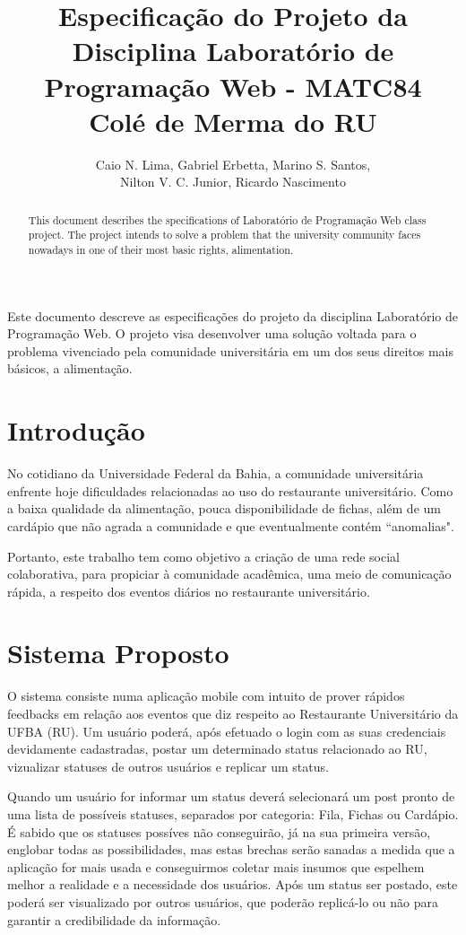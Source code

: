 \documentclass[12pt]{article}
\title{Especificação do Projeto da Disciplina Laboratório de Programação Web - MATC84\\ Colé de Merma do RU}
\author{Caio N. Lima\inst{1}, Gabriel Erbetta\inst{1}, Marino S. Santos\inst{1}, \\
  Nilton V. C. Junior\inst{1},  Ricardo Nascimento\inst{1}}
\begin{document}
\maketitle

\begin{abstract}
  This document describes the specifications of Laboratório de Programação Web class project.
  The project intends to solve a problem that the university community faces nowadays 
  in one of their most basic rights, alimentation.
\end{abstract}

\begin{resumo}
  Este documento descreve as especificações do projeto da disciplina Laboratório
  de Programação Web. O projeto visa desenvolver uma solução voltada para o problema
  vivenciado pela comunidade universitária em um dos seus direitos mais básicos, a alimentação.
\end{resumo}


\section{Introdução}

No cotidiano da Universidade Federal da Bahia, a comunidade universitária
enfrente hoje dificuldades relacionadas ao
uso do restaurante universitário. Como a baixa qualidade da alimentação,
pouca disponibilidade de fichas, além de um cardápio que não agrada a comunidade
e que eventualmente contém ``anomalias".

Portanto, este trabalho tem como objetivo a criação de uma rede social colaborativa,
para propiciar à comunidade acadêmica, uma meio de comunicação rápida, a respeito dos
eventos diários no restaurante universitário.



\section{Sistema Proposto} \label{sec:firstpage}

O sistema consiste numa aplicação mobile com intuito de prover rápidos feedbacks em relação
aos eventos que diz respeito ao Restaurante Universitário da UFBA (RU). Um usuário poderá,
após efetuado o login com as suas credenciais devidamente cadastradas, postar um determinado
status relacionado ao RU, vizualizar statuses de outros usuários e replicar um status.

Quando um usuário for informar um status deverá selecionará um post pronto de uma lista de possíveis
statuses, separados por categoria: Fila, Fichas ou Cardápio. É sabido que os statuses possíves não
conseguirão, já na sua primeira versão, englobar todas as possibilidades, mas estas brechas
serão sanadas a medida que a aplicação for mais usada e conseguirmos coletar mais insumos que
espelhem melhor a realidade e a necessidade dos usuários. Após um status ser postado, este poderá
ser visualizado por outros usuários, que poderão replicá-lo ou não para garantir a credibilidade
da informação.
\end{document}
